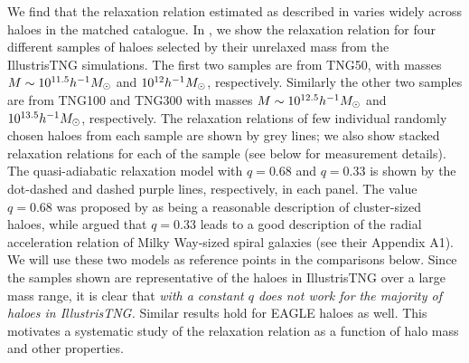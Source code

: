 We find that the relaxation relation estimated as described in  varies widely across haloes in the matched catalogue. In , we show the relaxation relation for four different samples of haloes selected by their unrelaxed mass from the IllustrisTNG simulations. %
The first two samples are from TNG50, with masses $M \sim 10^{11.5} h^{-1}M_{\odot}$ and $10^{12} h^{-1}M_{\odot}$, respectively. Similarly the other two samples are from TNG100 and TNG300 with masses $M \sim 10^{12.5} h^{-1}M_{\odot}$ and $10^{13.5} h^{-1}M_{\odot}$, respectively. 
The relaxation relations of few individual randomly chosen haloes from each sample are shown by grey lines; we also show stacked relaxation relations for each of the sample (see below for measurement details). The quasi-adiabatic relaxation model  with $q=0.68$ and $q=0.33$ is shown by the dot-dashed and dashed purple lines, respectively, in each panel. The value $q=0.68$ was proposed by \citet{2015JCAP...12..049S} as being a reasonable description of cluster-sized haloes, while \citet{2021MNRAS.507..632P} argued that $q=0.33$ leads to a good description of the radial acceleration relation of Milky Way-sized spiral galaxies (see their Appendix A1). We will use these two models as reference points in the comparisons below.
Since the samples shown are representative of the haloes in IllustrisTNG over a large mass range, it is clear that \emph{ with a constant $q$ does not work for the majority of haloes in IllustrisTNG.} Similar results hold for EAGLE haloes as well. This motivates a systematic study of the relaxation relation as a function of halo mass and other properties.

